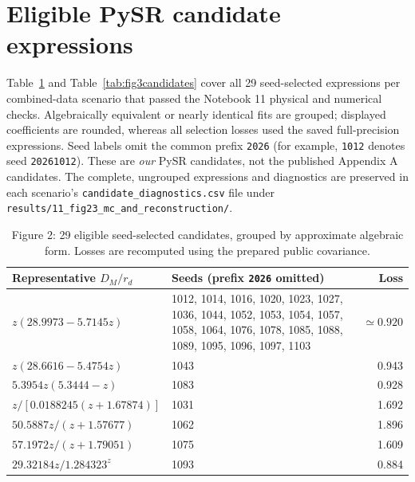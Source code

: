 \documentclass[11pt]{article}
\begin{document}
\appendix
\section{Eligible PySR candidate expressions}
Table~\ref{tab:fig2candidates} and Table~\ref{tab:fig3candidates} cover all 29 seed-selected expressions per combined-data scenario that passed the Notebook 11 physical and numerical checks. Algebraically equivalent or nearly identical fits are grouped; displayed coefficients are rounded, whereas all selection losses used the saved full-precision expressions. Seed labels omit the common prefix \texttt{2026} (for example, \texttt{1012} denotes seed \texttt{20261012}). These are \emph{our} PySR candidates, not the published Appendix A candidates. The complete, ungrouped expressions and diagnostics are preserved in each scenario's \texttt{candidate\_diagnostics.csv} file under \texttt{results/11\_fig23\_mc\_and\_reconstruction/}.

\begin{table}[htbp]
\centering\scriptsize
\caption{Figure 2: 29 eligible seed-selected candidates, grouped by approximate algebraic form. Losses are recomputed using the prepared public covariance.}
\label{tab:fig2candidates}
\begin{tabular}{@{}p{4.8cm}p{7.5cm}r@{}}
\toprule
Representative $D_M/r_d$ & Seeds (prefix \texttt{2026} omitted) & Loss\\
\midrule
$z(28.9973-5.7145z)$ & 1012, 1014, 1016, 1020, 1023, 1027, 1036, 1044, 1052, 1053, 1054, 1057, 1058, 1064, 1076, 1078, 1085, 1088, 1089, 1095, 1096, 1097, 1103 & $\simeq0.920$\\
$z(28.6616-5.4754z)$ & 1043 & 0.943\\
$5.3954z(5.3444-z)$ & 1083 & 0.928\\
$z/[0.0188245(z+1.67874)]$ & 1031 & 1.692\\
$50.5887z/(z+1.57677)$ & 1062 & 1.896\\
$57.1972z/(z+1.79051)$ & 1075 & 1.609\\
$29.32184z/1.284323^{z}$ & 1093 & 0.884\\
\bottomrule
\end{tabular}
\end{table}
\end{document}
